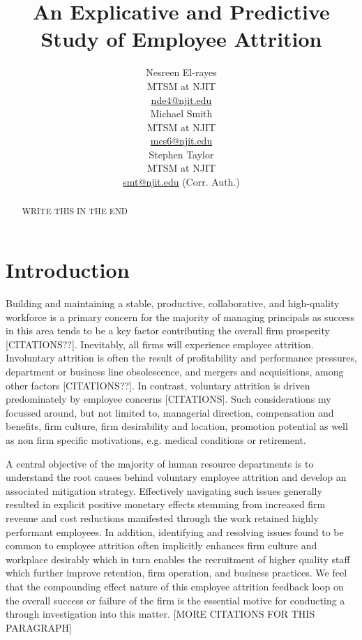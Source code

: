 \documentclass[10pt]{article}
\title{An Explicative and Predictive Study of Employee Attrition}
\author{Nesreen El-rayes\\
  MTSM at NJIT \\
  {\underline{nde4@njit.edu}} \\\And
  Michael Smith\\
  MTSM at NJIT \\
  {\underline{mes6@njit.edu}}\\\And 
  Stephen Taylor\\
  MTSM at NJIT \\
  {\underline{smt@njit.edu} (Corr. Auth.)} \\}
\date{}
\begin{document}
\maketitle
\begin{abstract}
WRITE THIS IN THE END
\end{abstract}

\section{Introduction}
Building and maintaining a stable, productive, collaborative, and high-quality workforce is a primary concern 
for the majority of managing principals as success in this area tends to be a key factor contributing the 
overall firm prosperity [CITATIONS??].  Inevitably, all firms will experience employee attrition.  
Involuntary attrition is often the result of profitability and performance pressures, department or business 
line obsolescence, and mergers and acquisitions, among other factors [CITATIONS??].  In contrast,
voluntary attrition is driven predominately by employee concerns [CITATIONS].  Such considerations 
my focussed around, but not limited to, managerial direction, compensation and benefits, firm culture, 
firm desirability and location, promotion potential as well as non firm specific motivations, e.g. medical 
conditions or retirement. 
  
A central objective of the majority of human resource departments is to understand the root causes 
behind voluntary employee attrition and develop an associated mitigation strategy.  Effectively 
navigating such issues generally resulted in explicit positive monetary effects stemming from increased 
firm revenue and cost reductions manifested through the work retained highly performant employees. 
In addition, identifying and resolving issues found to be common to employee attrition often implicitly 
enhances firm culture and workplace desirably which in turn enables the recruitment of higher quality 
staff which further improve retention, firm operation, and business practices.  
We feel that the compounding effect nature of 
this employee attrition feedback loop on the overall success or failure of the firm is the essential motive 
for conducting a through investigation into this matter. [MORE CITATIONS FOR THIS PARAGRAPH]  
\end{document}

